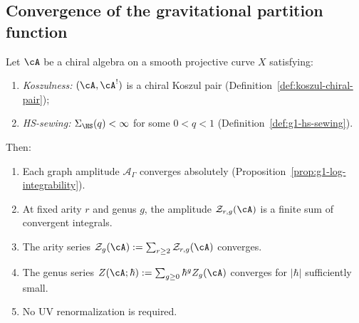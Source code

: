 \subsection{Convergence of the gravitational partition function}
\label{subsec:thqg-I-convergence-grav}

\begin{theorem}%
\label{thm:g1-perturbative-finiteness}%
%
Let\/ $\cA$ be a chiral algebra on a smooth projective curve $X$
satisfying:
\begin{enumerate}[label=\textup{(\roman*)}]
\item \emph{Koszulness:} $(\cA, \cA^!)$ is a chiral Koszul pair
  \textup{(}Definition~\textup{\ref{def:koszul-chiral-pair})};
\item \emph{HS-sewing:}
  $\Sigma_{\HS}(q) < \infty$ for some $0 < q < 1$
  \textup{(}Definition~\textup{\ref{def:g1-hs-sewing})}.
\end{enumerate}
Then:
\begin{enumerate}[label=\textup{(\alph*)}]
\item Each graph amplitude $\mathcal{A}_\Gamma$ converges
  absolutely
  \textup{(}Proposition~\textup{\ref{prop:g1-log-integrability})}.
\item At fixed arity $r$ and genus $g$, the amplitude
  $\mathcal{Z}_{r,g}(\cA)$ is a finite sum of convergent
  integrals.
\item The arity series
  $\mathcal{Z}_g(\cA) := \sum_{r \geq 2}
  \mathcal{Z}_{r,g}(\cA)$ converges.
\item The genus series
  $Z(\cA;\hbar) := \sum_{g \geq 0} \hbar^g Z_g(\cA)$
  converges for $|\hbar|$ sufficiently small.
\item No UV renormalization is required.
\end{enumerate}
\end{theorem}

